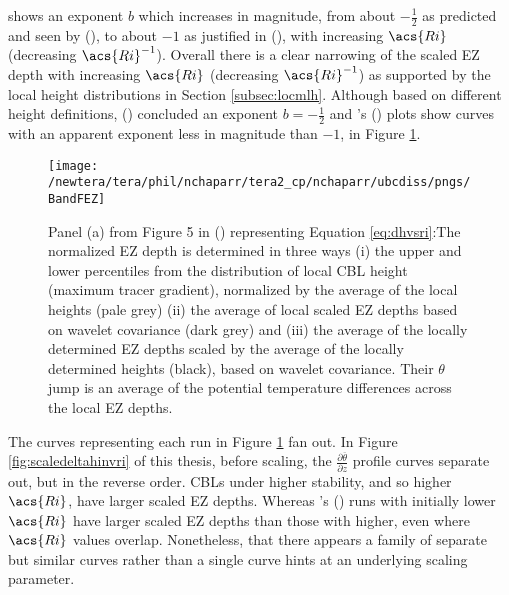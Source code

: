 shows an exponent $b$ which increases in magnitude, from about $-\frac{1}{2}$ as predicted and seen by \citeauthor{Boers89} (\citeyear{Boers89}), to about $-1$ as justified in \citeauthor{StullNelEl} (\citeyear{StullNelEl}),  with increasing $\acs{Ri}$ (decreasing $\acs{Ri}^{-1}$).  Overall there is a clear narrowing of the scaled \acs{EZ} depth with increasing $\acs{Ri}$ (decreasing $\acs{Ri}^{-1}$) as supported by the local height distributions in Section \ref{subsec:locmlh}.  Although based on different height definitions, \citeauthor{FedConzMir04} (\citeyear{FedConzMir04}) concluded an exponent $b = -\frac{1}{2}$ and \citeauthor{BrooksFowler2}'s (\citeyear{BrooksFowler2}) plots show curves with an apparent exponent less in magnitude than $-1$, in Figure \ref{fig:BandFEZ}. \\

\begin{figure}[htbp]
    \centering
    \texttt{[image: /newtera/tera/phil/nchaparr/tera2\_cp/nchaparr/ubcdiss/pngs/BandFEZ]}
    \caption[Relationship of Scaled \acs{EZ} depth to Richardson number from \citeauthor{BrooksFowler2}'s (\citeyear{BrooksFowler2})]{Panel (a) from Figure 5 in \citeauthor{BrooksFowler2} (\citeyear{BrooksFowler2}) representing Equation \ref{eq:dhvsri}:The normalized \acs{EZ} depth is determined in three ways (i) the upper and lower percentiles from the distribution of local \acs{CBL} height (maximum tracer gradient), normalized by the average of the local heights (pale grey) (ii) the average of local scaled \acs{EZ} depths based on wavelet covariance (dark grey) and (iii) the average of the locally determined \acs{EZ} depths scaled by the average of the locally determined heights (black), based on wavelet covariance.  Their $\theta$ jump is an average of the potential temperature differences across the local \acs{EZ} depths.}
    \label{fig:BandFEZ}   %
\end{figure}

The curves representing each run in Figure \ref{fig:BandFEZ} fan out.  In Figure \ref{fig:scaledeltahinvri} of this thesis, before scaling, the $\frac{\partial \overline{\theta}}{\partial z}$ profile curves separate out, but in the reverse order.  \acs{CBL}s under higher stability, and so higher $\acs{Ri}$, have larger scaled \acs{EZ} depths.  Whereas \citeauthor{BrooksFowler2}'s (\citeyear{BrooksFowler2}) runs with initially lower $\acs{Ri}$ have larger scaled \acs{EZ} depths than those with higher, even where $\acs{Ri}$ values overlap. Nonetheless, that there appears a family of separate but similar curves rather than a single curve hints at an underlying scaling parameter.\\     


